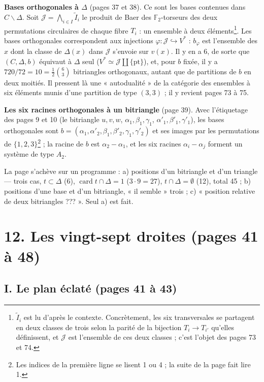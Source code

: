 \documentclass[11pt,a4paper]{article}
\begin{document}
\textbf{Bases orthogonales à $\Delta$} (pages 37 et 38). Ce sont les bases
contenues dans $C \smallsetminus \Delta$. Soit $\mathcal{J} = \bigwedge_{i \in
I} \widetilde I_i$ le produit de Baer des $\mathbb{F}_2$-torseurs des deux
permutations circulaires de chaque fibre $T_i$ : un ensemble à deux
éléments\footnote{$\widetilde I_i$ est lu d'après le contexte. Concrètement,
les six transversales se partagent en deux classes de trois selon la parité
de la bijection $T_i \to T_{i'}$ qu'elles définissent, et $\mathcal{J}$ est
l'ensemble de ces deux classes ; c'est l'objet des pages 73 et 74.}. Les bases
orthogonales correspondent aux injections $\varphi : \mathcal{J}
\hookrightarrow V^*$ : $b_\varphi$ est l'ensemble des $x$ dont la classe de
$\Delta(x)$ dans $\mathcal{J}$ s'envoie sur $v(x)$. Il y en a $6$, de sorte que
$(C, \Delta, b)$ équivaut à $\Delta$ seul ($V^* \simeq \mathcal{J} \amalg
\lbrace \mathrm{pt}\rbrace$), et, pour $b$ fixée, il y a $720/72 = 10 =
\tfrac12\binom63$ bitriangles orthogonaux, autant que de partitions de $b$ en
deux moitiés. Il pressent là une « autodualité » de la catégorie des ensembles
à six éléments munis d'une partition de type $(3, 3)$ ; il y revient pages 73
à 75.

\textbf{Les six racines orthogonales à un bitriangle} (page 39). Avec
l'étiquetage des pages 9 et 10 (le bitriangle $u, v, w$, $\alpha_1, \beta_1,
\gamma_1$, $\alpha'_1, \beta'_1, \gamma'_1$), les bases orthogonales sont $b =
(\alpha_1, \alpha'_2, \beta_1, \beta'_2, \gamma_1, \gamma'_2)$ et ses images
par les permutations de $\lbrace 1, 2, 3\rbrace$\footnote{Les indices de la
première ligne se lisent 1 ou 4 ; la suite de la page fait lire 1.} ; la
racine de $b$ est $\alpha_2 - \alpha_1$, et les six racines $\alpha_i -
\alpha_j$ forment un système de type $A_2$.

La page s'achève sur un programme : a) positions d'un bitriangle et d'un
triangle --- trois cas, $t \subset \Delta$ (6), $\operatorname{card} t \cap
\Delta = 1$ ($3 \cdot 9 = 27$), $t \cap \Delta = \emptyset$ (12), total 45 ;
b) positions d'une base et d'un bitriangle, « il semble » trois ; c) « position
relative de deux bitriangles ??? ». Seul a) est fait.

\section*{12. Les vingt-sept droites (pages 41 à 48)}

\subsection*{I. Le plan éclaté (pages 41 à 43)}
\end{document}
